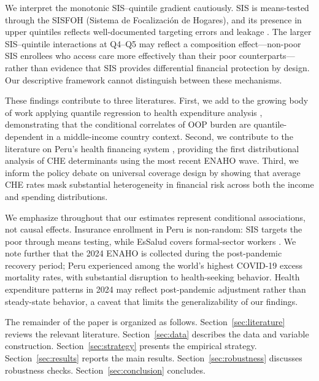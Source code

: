 We interpret the monotonic SIS--quintile gradient cautiously. SIS is means-tested through the SISFOH (Sistema de Focalizaci\'on de Hogares), and its presence in upper quintiles reflects well-documented targeting errors and leakage \citep{Cortez2008, Francke2013}. The larger SIS--quintile interactions at Q4--Q5 may reflect a composition effect---non-poor SIS enrollees who access care more effectively than their poor counterparts---rather than evidence that SIS provides differential financial protection by design. Our descriptive framework cannot distinguish between these mechanisms.

These findings contribute to three literatures. First, we add to the growing body of work applying quantile regression to health expenditure analysis \citep{Jones2013, Machado2019}, demonstrating that the conditional correlates of OOP burden are quantile-dependent in a middle-income country context. Second, we contribute to the literature on Peru's health financing system \citep{EspinozaPajuelo2024, Petrera2013}, providing the first distributional analysis of CHE determinants using the most recent ENAHO wave. Third, we inform the policy debate on universal coverage design by showing that average CHE rates mask substantial heterogeneity in financial risk across both the income and spending distributions.

We emphasize throughout that our estimates represent conditional associations, not causal effects. Insurance enrollment in Peru is non-random: SIS targets the poor through means testing, while EsSalud covers formal-sector workers \citep{Wagstaff2010, Acharya2012}. We note further that the 2024 ENAHO is collected during the post-pandemic recovery period; Peru experienced among the world's highest COVID-19 excess mortality rates, with substantial disruption to health-seeking behavior. Health expenditure patterns in 2024 may reflect post-pandemic adjustment rather than steady-state behavior, a caveat that limits the generalizability of our findings.

The remainder of the paper is organized as follows. Section~\ref{sec:literature} reviews the relevant literature. Section~\ref{sec:data} describes the data and variable construction. Section~\ref{sec:strategy} presents the empirical strategy. Section~\ref{sec:results} reports the main results. Section~\ref{sec:robustness} discusses robustness checks. Section~\ref{sec:conclusion} concludes.
